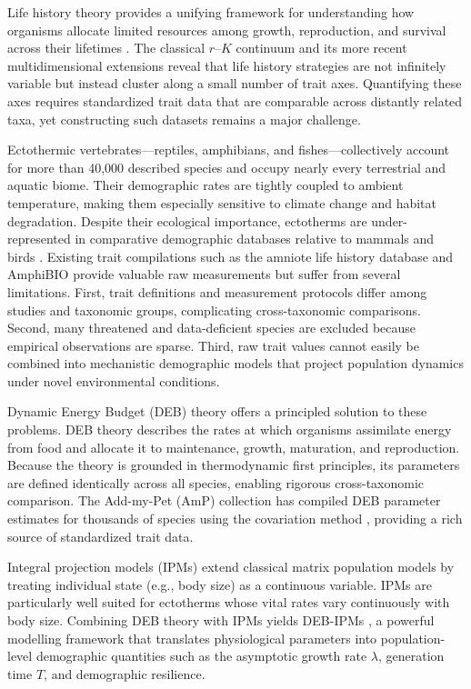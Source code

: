 \documentclass[11pt]{article}
\begin{document}
Life history theory provides a unifying framework for understanding how organisms allocate limited resources among growth, reproduction, and survival across their lifetimes \citep{stearns1992}. The classical $r$--$K$ continuum \citep{pianka1970} and its more recent multidimensional extensions \citep{salguero2016} reveal that life history strategies are not infinitely variable but instead cluster along a small number of trait axes. Quantifying these axes requires standardized trait data that are comparable across distantly related taxa, yet constructing such datasets remains a major challenge.

Ectothermic vertebrates---reptiles, amphibians, and fishes---collectively account for more than 40,000 described species and occupy nearly every terrestrial and aquatic biome. Their demographic rates are tightly coupled to ambient temperature, making them especially sensitive to climate change and habitat degradation. Despite their ecological importance, ectotherms are under-represented in comparative demographic databases relative to mammals and birds \citep{jones2014}. Existing trait compilations such as the amniote life history database \citep{myhrvold2015} and AmphiBIO \citep{oliveira2017} provide valuable raw measurements but suffer from several limitations. First, trait definitions and measurement protocols differ among studies and taxonomic groups, complicating cross-taxonomic comparisons. Second, many threatened and data-deficient species are excluded because empirical observations are sparse. Third, raw trait values cannot easily be combined into mechanistic demographic models that project population dynamics under novel environmental conditions.

Dynamic Energy Budget (DEB) theory \citep{kooijman2010} offers a principled solution to these problems. DEB theory describes the rates at which organisms assimilate energy from food and allocate it to maintenance, growth, maturation, and reproduction. Because the theory is grounded in thermodynamic first principles, its parameters are defined identically across all species, enabling rigorous cross-taxonomic comparison. The Add-my-Pet (AmP) collection \citep{marques2018} has compiled DEB parameter estimates for thousands of species using the covariation method \citep{lika2011}, providing a rich source of standardized trait data.

Integral projection models (IPMs) \citep{easterling2000, ellner2006} extend classical matrix population models \citep{caswell2001} by treating individual state (e.g., body size) as a continuous variable. IPMs are particularly well suited for ectotherms whose vital rates vary continuously with body size. Combining DEB theory with IPMs yields DEB-IPMs \citep{smallegange2017}, a powerful modelling framework that translates physiological parameters into population-level demographic quantities such as the asymptotic growth rate $\lambda$, generation time $T$, and demographic resilience.
\end{document}
